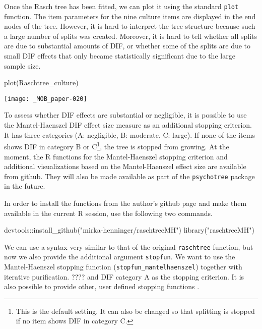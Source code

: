 \documentclass[doc,floatsintext,natbib]{apa7}
\begin{document}
Once the Rasch tree has been fitted, we can plot it using the standard \texttt{plot} function. The item parameters for the nine culture items are displayed in the end nodes of the tree. However, it is hard to interpret the tree structure because such a large number of splits was created. Moreover, it is hard to tell whether all splits are due to substantial amounts of DIF, or whether some of the splits are due to small DIF effects that only became statistically significant due to the large sample size. 


\begin{Schunk}
\begin{Sinput}
 plot(Raschtree_culture)
\end{Sinput}
\end{Schunk}
\texttt{[image: \_MOB\_paper-020]}


To assess whether DIF effects are substantial or negligible, it is possible to use the Mantel-Haenszel DIF effect size measure as an additional stopping criterion. It has three categories (A: negligible, B: moderate, C: large). If none of the items shows DIF in category B or C\footnote{This is the default setting. It can also be changed so that splitting is stopped if no item shows DIF in category C.}, the tree is stopped from growing. 
At the moment, the R functions for the Mantel-Haenszel stopping criterion and additional visualizations based on the Mantel-Haenszel effect size are available from github. They will also be made available as part of the \texttt{psychotree} package in the future. 

In order to install the functions from the author's github page and make them available in the current R session, use the following two commands. 
 

\begin{Schunk}
\begin{Sinput}
 devtools::install_github("mirka-henninger/raschtreeMH")
 library("raschtreeMH")
\end{Sinput}
\end{Schunk}

We can use a syntax very similar to that of the original \texttt{raschtree} function, but now we also provide the additional argument \texttt{stopfun}. We want to use the Mantel-Haenszel stopping function (\texttt{stopfun\_mantelhaenszel}) together with iterative purification. ???? and DIF category A as the stopping criterion.  It is also possible to provide other, user defined stopping functions \citep[see][for details]{HennyDeba23}. 
\end{document}
